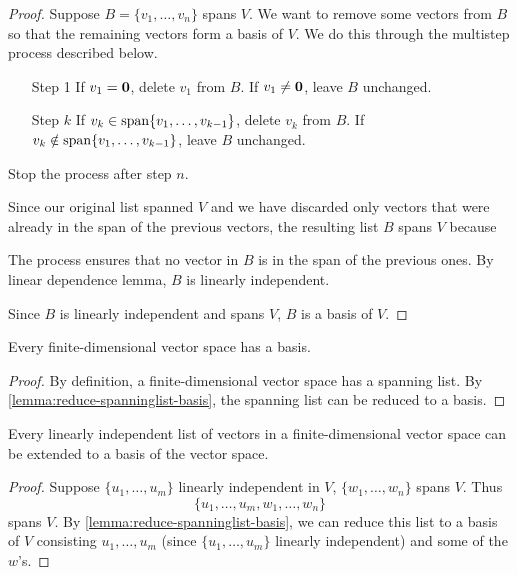 \begin{proof}
Suppose $B=\{v_1,\dots,v_n\}$ spans $V$. We want to remove some vectors from $B$ so that the remaining vectors form a basis of $V$. We do this through the multistep process described below.

\begin{enumerate}
\item[Step 1] If $v_1=\vb{0}$, delete $v_1$ from $B$. If $v_1\neq\vb{0}$, leave $B$ unchanged.
\item[Step $k$] If $v_k\in\operatorname{span}\{v_1,\dots,v_{k-1}\}$, delete $v_k$ from $B$. If $v_k\notin\operatorname{span}\{v_1,\dots,v_{k-1}\}$, leave $B$ unchanged.
\end{enumerate}

Stop the process after step $n$.

Since our original list spanned $V$ and we have discarded only vectors that were already in the span of the previous vectors, the resulting list $B$ spans $V$ because

The process ensures that no vector in $B$ is in the span of the previous ones. By linear dependence lemma, $B$ is linearly independent.

Since $B$ is linearly independent and spans $V$, $B$ is a basis of $V$.
\end{proof}

\begin{proposition}
Every finite-dimensional vector space has a basis.
\end{proposition}

\begin{proof}
By definition, a finite-dimensional vector space has a spanning list. By \cref{lemma:reduce-spanninglist-basis}, the spanning list can be reduced to a basis.
\end{proof}

\begin{lemma}\label{lemma:extend-linind-basis}
Every linearly independent list of vectors in a finite-dimensional vector space can be extended to a basis of the vector space.
\end{lemma}

\begin{proof}
Suppose $\{u_1,\dots,u_m\}$ linearly independent in $V$, $\{w_1,\dots,w_n\}$ spans $V$. Thus
\[\{u_1,\dots,u_m,w_1,\dots,w_n\}\]
spans $V$. By \cref{lemma:reduce-spanninglist-basis}, we can reduce this list to a basis of $V$ consisting $u_1,\dots,u_m$ (since $\{u_1,\dots,u_m\}$ linearly independent) and some of the $w$'s.
\end{proof}

